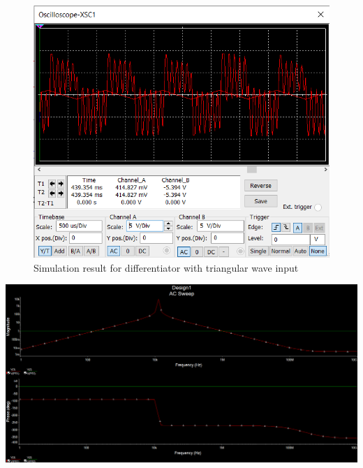 \documentclass[a4paper, 12pt, english]{article}
\newenvironment{Figure}
  {\par\medskip\noindent\minipage{\linewidth}}
  {\endminipage\par\medskip}
\newlength{\simheight}
\begin{document}
\begin{figure}[H]
    \centering
    \includegraphics[width=\linewidth, height=0.8\simheight]{images/diff triangle.png}
    \caption{Simulation result for differentiator with triangular wave input}
    \label{fig:Simulation result for differentiator with triangular wave input}
\end{figure}

\begin{Figure}
 \centering
 \includegraphics[width=\linewidth, scale=2]{images/diff freq res.png}
\end{Figure}
\end{document}
